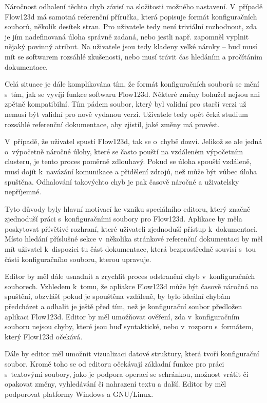 \documentclass[FM,DP]{tulthesis}
\begin{document}

Náročnost odhalení těchto chyb závisí na složitosti možného nastavení. V~případě Flow123d má samotná referenční příručka, která popisuje formát konfiguračních souborů, několik desítek stran. Pro uživatele tedy není triviální rozhodnout, zda je jím nadefinovaná úloha správně zadaná, nebo jestli např. zapomněl vyplnit nějaký povinný atribut. Na uživatele jsou tedy kladeny velké nároky -- buď musí mít se softwarem rozsáhlé zkušenosti, nebo musí trávit čas hledáním a pročítáním dokumentace.

Celá situace je dále komplikována tím, že formát konfiguračních souborů se mění s~tím, jak se vyvíjí funkce softwaru Flow123d. Některé změny bohužel nejsou ani zpětně kompatibilní. Tím pádem soubor, který byl validní pro starší verzi už nemusí být validní pro nově vydanou verzi. Uživatele tedy opět čeká studium rozsáhlé referenční dokumentace, aby zjistil, jaké změny má provést.

V~případě, že uživatel spustí Flow123d, tak se o~chybě dozví. Jelikož se ale jedná o~výpočetně náročné úlohy, které se často pouští na vzdáleném výpočetním clusteru, je tento proces poměrně zdlouhavý. Pokud se úloha spouští vzdáleně, musí dojít k~navázání komunikace a přidělení zdrojů, než může být vůbec úloha spuštěna. Odhalování takovýchto chyb je pak časově náročné a uživatelsky nepříjemné.

Tyto důvody byly hlavní motivací ke vzniku speciálního editoru, který značně zjednoduší práci s~konfiguračními soubory pro Flow123d. Aplikace by měla poskytovat přívětivé rozhraní, které uživateli zjednoduší přístup k~dokumentaci. Místo hledání příslušné sekce v~několika stránkové referenční dokumentaci by měl mít uživatel k~dispozici tu část dokumentace, která bezprostředně souvisí s~tou části konfiguračního souboru, kterou upravuje.

Editor by měl dále usnadnit a zrychlit proces odstranění chyb v~konfiguračních souborech. Vzhledem k~tomu, že apliakce Flow123d může být časově náročná na spuštění, obzvlášť pokud je spouštěna vzdáleně, by bylo ideální chybám předcházet a odhalit je ještě před tím, než je konfigurační soubor předložen aplikaci Flow123d. Editor by měl umožňovat ověření, zda v~konfiguračním souboru nejsou chyby, které jsou buď syntaktické, nebo v~rozporu s~formátem, který Flow123d očekává.

Dále by editor měl umožnit vizualizaci datové struktury, která tvoří konfigurační soubor. Kromě toho se od editoru očekávají základní funkce pro práci s~textovými soubory, jako je podpora operací se schránkou, možnost vrátit či opakovat změny, vyhledávání či nahrazení textu a další. Editor by měl podporovat platformy Windows a GNU/Linux. %
\end{document}

